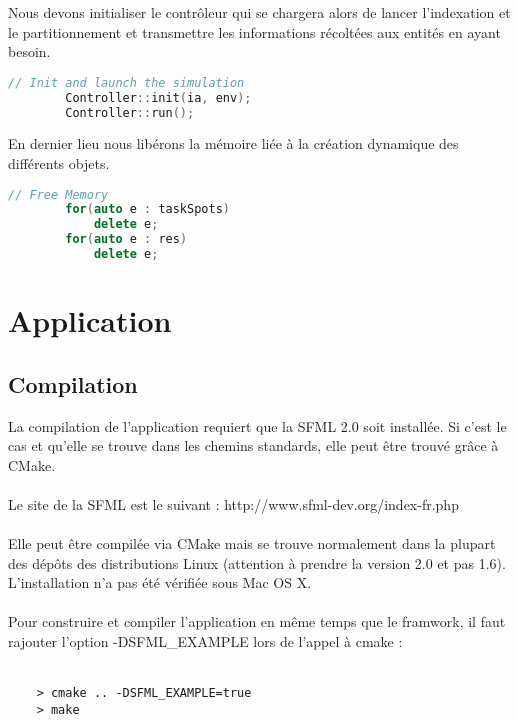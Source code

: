 Nous devons initialiser le contrôleur qui se chargera alors de lancer l'indexation et le partitionnement et transmettre les informations récoltées aux entités en ayant besoin.

\begin{lstlisting}[label=nvi_code,caption=Initialisation et lancement du contrôleur,language=C++]         
        // Init and launch the simulation
        Controller::init(ia, env);
        Controller::run();
\end{lstlisting}

En dernier lieu nous libérons la mémoire liée à la création dynamique des différents objets.

\begin{lstlisting}[label=nvi_code,caption=Libération des resources,language=C++]        
        // Free Memory
        for(auto e : taskSpots)
            delete e;
        for(auto e : res)
            delete e;
\end{lstlisting}

\section{Application}
\subsection{Compilation}
La compilation de l'application requiert que la SFML 2.0 soit installée. Si c'est le cas et qu'elle se trouve dans les chemins standards, elle peut être trouvé grâce à CMake.\\\\

Le site de la SFML est le suivant : http://www.sfml-dev.org/index-fr.php \\\\

Elle peut être compilée via CMake mais se trouve normalement dans la plupart des dépôts des distributions Linux (attention à prendre la version 2.0 et pas 1.6). L'installation n'a pas été vérifiée sous Mac OS X.\\\\

Pour construire et compiler l'application en même temps que le framwork, il faut rajouter l'option -DSFML\_EXAMPLE lors de l'appel à cmake :\\\\

\begin{verbatim}
    > cmake .. -DSFML_EXAMPLE=true
    > make
\end{verbatim}

